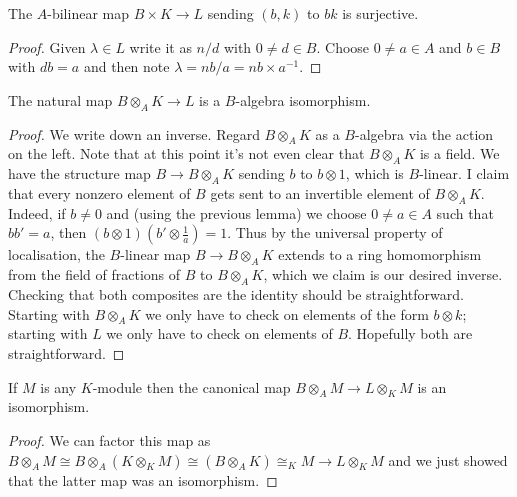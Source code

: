 \begin{corollary}
  \label{IsDedekindDomain.AKLB.surjective_tensorProduct_map}
  The $A$-bilinear map $B\times K\to L$ sending $(b,k)$ to $bk$ is surjective.
\end{corollary}
\begin{proof} Given $\lambda\in L$ write it as $n/d$ with $0\not=d\in B$. Choose $0\not=a\in A$
  and $b\in B$ with $db=a$ and then note $\lambda=nb/a=nb\times a^{-1}$.
\end{proof}

\begin{corollary}
  \label{IsDedekindDomain.FiniteAdeleRing.tensorProduct_algEquiv}
  The natural map $B\otimes_AK\to L$ is a $B$-algebra isomorphism.
\end{corollary}
\begin{proof}

We write down an inverse. Regard $B\otimes_AK$ as a $B$-algebra via the action on the left.
Note that at this point it's not even clear that $B\otimes_AK$ is a field. We have the
structure map $B\to B\otimes_AK$ sending $b$ to $b\otimes1$, which is $B$-linear. I claim
that every nonzero element of $B$ gets sent to an invertible element of $B\otimes_AK$.
Indeed, if $b\not=0$ and (using the previous lemma) we choose $0\not=a\in A$ such that
$bb'=a$, then $(b\otimes1)(b'\otimes\frac1a)=1$. Thus by the universal property of
localisation, the $B$-linear map $B\to B\otimes_AK$ extends to a ring homomorphism from the field
of fractions of $B$ to $B\otimes_AK$, which we claim is our desired inverse.
Checking that both composites are the identity should be straightforward. Starting
with $B\otimes_AK$ we only have to check on elements of the form $b\otimes k$;
starting with $L$ we only have to check on elements of $B$. Hopefully both are
straightforward.
\end{proof}

\begin{corollary}
  \label{IsDedekindDomain.AKLB.tensorProduct_module_algEquiv}
  \leanok
  If $M$ is any $K$-module then the canonical map $B\otimes_A M\to L\otimes_K M$
  is an isomorphism.
\end{corollary}
\begin{proof}
  \leanok
  We can factor this map as $B\otimes_AM\cong B\otimes_A(K\otimes_KM)\cong
  (B\otimes_A K)\cong_KM\to L\otimes_KM$ and we just showed that the latter map was an
  isomorphism.
\end{proof}

